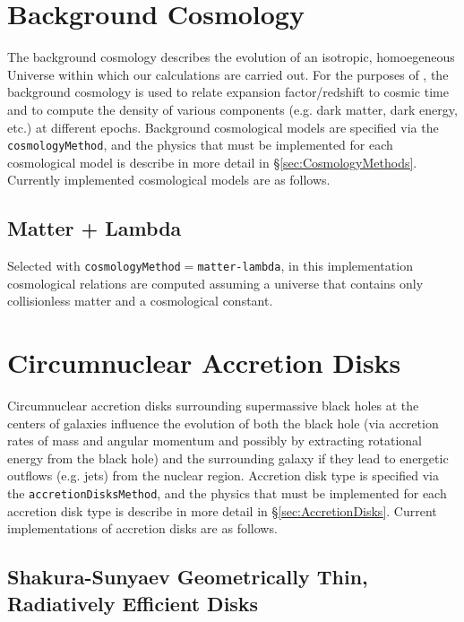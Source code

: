 \section{Background Cosmology}

The background cosmology describes the evolution of an isotropic, homoegeneous Universe within which our calculations are carried out. For the purposes of \glc, the background cosmology is used to relate expansion factor/redshift to cosmic time and to compute the density of various components (e.g. dark matter, dark energy, etc.) at different epochs. Background cosmological models are specified via the {\tt cosmologyMethod}, and the physics that must be implemented for each cosmological model is describe in more detail in \S\ref{sec:CosmologyMethods}. Currently implemented cosmological models are as follows.

\subsection{Matter + Lambda}

Selected with {\tt cosmologyMethod}$=${\tt matter-lambda}, in this implementation cosmological relations are computed assuming a universe that contains only collisionless matter and a cosmological constant.


\section{Circumnuclear Accretion Disks}\label{sec:CircumnuclearDisks}

Circumnuclear accretion disks surrounding supermassive black holes at the centers of galaxies influence the evolution of both the black hole (via accretion rates of mass and angular momentum and possibly by extracting rotational energy from the black hole) and the surrounding galaxy if they lead to energetic outflows (e.g. jets) from the nuclear region. Accretion disk type is specified via the {\tt accretionDisksMethod}, and the physics that must be implemented for each accretion disk type is describe in more detail in \S\ref{sec:AccretionDisks}. Current implementations of accretion disks are as follows.

\subsection{Shakura-Sunyaev Geometrically Thin, Radiatively Efficient Disks}

